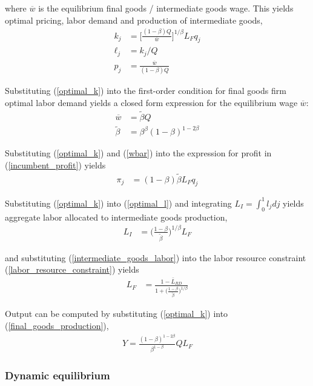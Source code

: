 \documentclass[11pt,english]{article}
\theoremstyle{remark}
\begin{document}
where $\overline{w}$ is the equilibrium final goods / intermediate goods wage.
This yields optimal pricing, labor demand and production of intermediate goods,
\begin{align}
k_j &= \Big[ \frac{(1-\beta) Q}{\overline{w}} \Big]^{1/\beta}L_F q_j  \label{optimal_k}\\
\ell_j &= k_j / Q \label{optimal_l}\\
p_j &= \frac{\overline{w}}{(1-\beta) Q} \label{optimal_p}
\end{align}

Substituting (\ref{optimal_k}) into the first-order condition for final goods firm optimal labor demand yields a closed form expression for the equilibrium wage $\overline{w}$:
\begin{align}
\overline{w} &= \tilde{\beta} Q \label{wbar} \\
\tilde{\beta} &= \beta^{\beta} (1-\beta)^{1-2\beta} \label{def_cbeta}
\end{align}

Substituting (\ref{optimal_k}) and (\ref{wbar}) into the expression for profit in (\ref{incumbent_profit}) yields
\begin{align}
\pi_j &= (1-\beta) \tilde{\beta} L_F q_j \label{profits_eq}
\end{align}

Substituting (\ref{optimal_k}) into (\ref{optimal_l}) and integrating $L_I = \int_0^1 l_j dj$ yields aggregate labor allocated to intermediate goods production,
\begin{align}
L_I &= \Big( \frac{1-\beta}{\tilde{\beta}} \Big)^{1 / \beta} L_F \label{intermediate_goods_labor}
\end{align}

and substituting (\ref{intermediate_goods_labor}) into the labor resource constraint (\ref{labor_resource_constraint}) yields
\begin{align}
L_F &= \frac{1 - \bar{L}_{RD}}{1 + \Big(\frac{1-\beta}{\tilde{\beta}}\Big)^{1/\beta}}
\end{align}

Output can be computed by substituting (\ref{optimal_k}) into (\ref{final_goods_production}), 
\begin{align}
Y = \frac{(1-\beta)^{1-2\beta}}{\beta^{1-\beta}} Q L_F \label{flow_output}
\end{align}

\subsubsection{Dynamic equilibrium}\label{subsubsec:dynamic_equilibrium_original_solution}
\end{document}
